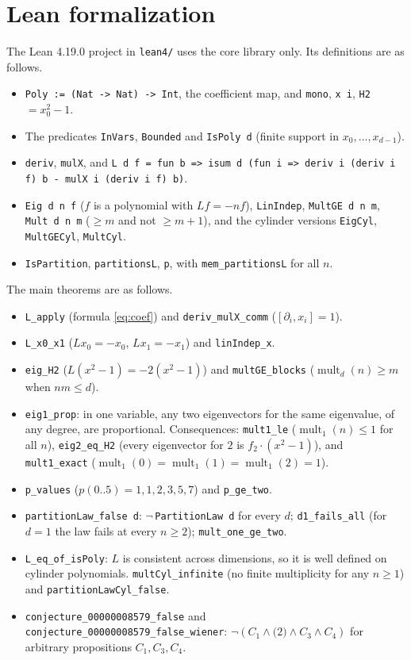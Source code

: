 \documentclass[11pt]{article}
\theoremstyle{definition}
\theoremstyle{remark}
\newcommand{\mult}{\operatorname{mult}}
\begin{document}
\section{Lean formalization}
The Lean 4.19.0 project in \texttt{lean4/} uses the core library only. Its definitions
are as follows.
\begin{itemize}
\item \texttt{Poly := (Nat -> Nat) -> Int}, the coefficient map, and \texttt{mono},
\texttt{x i}, \texttt{H2} $=x_0^2-1$.
\item The predicates \texttt{InVars}, \texttt{Bounded} and \texttt{IsPoly d} (finite support in
$x_0,\dots,x_{d-1}$).
\item \texttt{deriv}, \texttt{mulX}, and \texttt{L d f = fun b => isum d (fun i => deriv i (deriv i f) b - mulX i (deriv i f) b)}.
\item \texttt{Eig d n f} ($f$ is a polynomial with $Lf=-nf$), \texttt{LinIndep},
\texttt{MultGE d n m}, \texttt{Mult d n m} ($\ge m$ and not $\ge m+1$), and the
cylinder versions \texttt{EigCyl}, \texttt{MultGECyl}, \texttt{MultCyl}.
\item \texttt{IsPartition}, \texttt{partitionsL}, \texttt{p}, with
\texttt{mem\_partitionsL} for all $n$.
\end{itemize}
The main theorems are as follows.
\begin{itemize}
\item \texttt{L\_apply} (formula \eqref{eq:coef}) and \texttt{deriv\_mulX\_comm} ($[\partial_i,x_i]=1$).
\item \texttt{L\_x0\_x1} ($Lx_0=-x_0$, $Lx_1=-x_1$) and \texttt{linIndep\_x}.
\item \texttt{eig\_H2} ($L(x^2-1)=-2(x^2-1)$) and \texttt{multGE\_blocks} ($\mult_d(n)\ge m$ when $nm\le d$).
\item \texttt{eig1\_prop}: in one variable, any two eigenvectors for the same eigenvalue,
of any degree, are proportional. Consequences: \texttt{mult1\_le} ($\mult_1(n)\le1$
for all $n$), \texttt{eig2\_eq\_H2} (every eigenvector for $2$ is $f_2\cdot(x^2-1)$), and
\texttt{mult1\_exact} ($\mult_1(0)=\mult_1(1)=\mult_1(2)=1$).
\item \texttt{p\_values} ($p(0..5)=1,1,2,3,5,7$) and \texttt{p\_ge\_two}.
\item \texttt{partitionLaw\_false d}: $\neg\,$\texttt{PartitionLaw d} for every $d$;
\texttt{d1\_fails\_all} (for $d=1$ the law fails at every $n\ge2$);
\texttt{mult\_one\_ge\_two}.
\item \texttt{L\_eq\_of\_isPoly}: $L$ is consistent across dimensions, so it is well defined on
cylinder polynomials. \texttt{multCyl\_infinite} (no finite multiplicity for any
$n\ge1$) and \texttt{partitionLawCyl\_false}.
\item \texttt{conjecture\_00000008579\_false} and \texttt{conjecture\_00000008579\_false\_wiener}:
$\neg(C_1\wedge\text{(2)}\wedge C_3\wedge C_4)$ for arbitrary propositions $C_1,C_3,C_4$.
\end{itemize}
\end{document}
